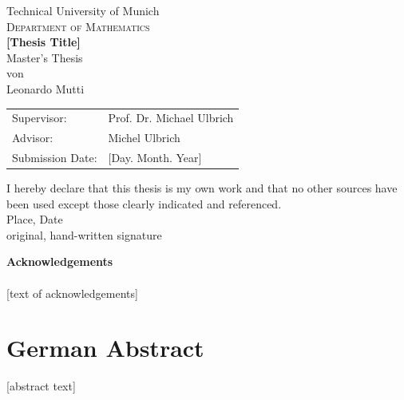 \documentclass[english,a4paper,9pt,oneside]{scrbook}	%
\theoremstyle{break}
\theoremstyle{remark}
\begin{document}
\pagestyle{empty}       %
\vspace*{1.5cm}
\begin{center}
{\Huge Technical University of Munich}
\\
\vspace*{1.5cm}
{\huge \textsc{Department of Mathematics}}
\\
\vspace*{3cm}
{\Huge \textbf{[Thesis Title]}}
\\
\vspace*{3cm}
{\Large Master's Thesis}\linebreak \\
{\Large von}\linebreak \\
{\Large Leonardo Mutti}\\
\vspace*{3cm}
{\Large 
\begin{tabular}{ll}
Supervisor: & Prof. Dr. Michael Ulbrich\\
Advisor: & Michel Ulbrich\\
Submission Date: & [Day. Month. Year]
\end{tabular}
}
\end{center}
\newpage    %

\vspace*{18cm}
\noindent
I hereby declare that this thesis is my own work and that no other sources have been used except those clearly indicated and referenced.
\\[2cm]
Place, Date\\
original, hand-written signature
\newpage

\vspace*{2.2cm}
\noindent %
{\Huge \textbf{Acknowledgements}} \\
\vspace*{1.6cm} \\
\pagestyle{headings}
[text of acknowledgements]

\newpage
\section*{German Abstract}
[abstract text]
\end{document}
